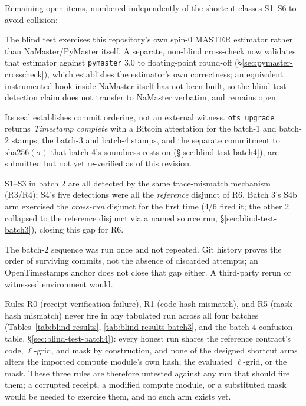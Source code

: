 \documentclass[11pt]{article}
\begin{document}
Remaining open items, numbered independently of the shortcut classes S1--S6
to avoid collision:
\begin{description}[leftmargin=1.6cm,style=nextline]
\item[L1 (estimator).] The blind test exercises this repository's own
  spin-0 MASTER estimator rather than NaMaster/PyMaster itself. A separate,
  non-blind cross-check now validates that estimator against
  \texttt{pymaster} 3.0 to floating-point round-off
  (\S\ref{sec:pymaster-crosscheck}), which establishes the estimator's own
  correctness; an equivalent instrumented hook inside NaMaster itself has
  not been built, so the blind-test detection claim does not transfer to
  NaMaster verbatim, and remains open.
\item[L2 (external anchor).] Its seal establishes commit ordering, not an
  external witness. \texttt{ots upgrade} returns \emph{Timestamp
  complete} with a Bitcoin attestation for the batch-1 and batch-2 stamps;
  the batch-3 and batch-4 stamps, and the separate commitment to
  \(\mathrm{sha256}(\sigma)\) that batch 4's soundness rests on
  (\S\ref{sec:blind-test-batch4}), are submitted but not yet re-verified as
  of this revision.
\item[L3 (mechanism coverage).] S1--S3 in batch 2 are all detected by the
  same trace-mismatch mechanism (R3/R4); S4's five detections were all the
  \emph{reference} disjunct of R6. Batch 3's S4b arm exercised the
  \emph{cross-run} disjunct for the first time (4/6 fired it; the other 2
  collapsed to the reference disjunct via a named source run,
  \S\ref{sec:blind-test-batch3}), closing this gap for R6.
\item[L4 (single run).] The batch-2 sequence was run once and not repeated.
  Git history proves the order of surviving commits, not the absence of
  discarded attempts; an OpenTimestamps anchor does not close that gap
  either. A third-party rerun or witnessed environment would.
\item[L5 (untested rules).] Rules R0 (receipt verification failure), R1
  (code hash mismatch), and R5 (mask hash mismatch) never fire in any
  tabulated run across all four batches (Tables~\ref{tab:blind-results},
  \ref{tab:blind-results-batch3}, and the batch-4 confusion table,
  \S\ref{sec:blind-test-batch4}): every honest run shares the reference
  contract's code, \(\ell\)-grid, and mask by construction, and none of the
  designed shortcut arms alters the imported compute module's own hash, the
  evaluated \(\ell\)-grid, or the mask. These three rules are therefore
  untested against any run that should fire them; a corrupted receipt, a
  modified compute module, or a substituted mask would be needed to exercise
  them, and no such arm exists yet.
\end{description}
\end{document}
